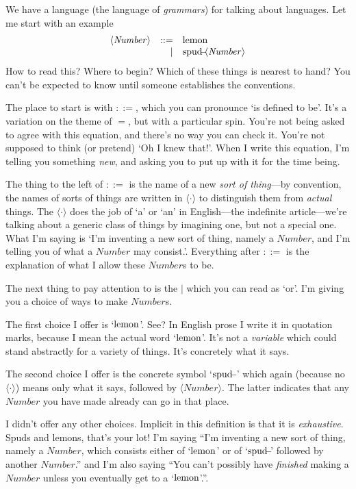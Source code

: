 \documentclass{book}
\begin{document}
We have a language (the language of \emph{grammars}) for talking about languages. Let me start with an example
\newcommand{\nt}[1]{\langle\mathit{#1}\rangle}
\[\begin{array}{rrl}
\nt{Number} & ::= & \lemon\\
            &   | & \spud\nt{Number}
\end{array}\]
How to read this? Where to begin? Which of these things is nearest to hand? You can't be expected to know until someone establishes the conventions.

The place to start is with $::=$, which you can pronounce `is defined to be'. It's a variation on the theme of $=$, but with a particular spin. You're not being asked to agree with this equation, and there's no way you can check it. You're not supposed to think (or pretend) `Oh I knew that!'. When I write this equation, I'm telling you something \emph{new}, and asking you to put up with it for the time being.

The thing to the left of $::=$ is the name of a new \emph{sort of thing}---by convention, the names of sorts of things are written in $\nt{\cdot}$ to distinguish them from \emph{actual} things. The $\nt{\cdot}$ does the job of `a' or `an' in English---the indefinite article---we're talking about a generic class of things by imagining one, but not a special one. What I'm saying is `I'm inventing a new sort of thing, namely a $\mathit{Number}$, and I'm telling you of what a $\mathit{Number}$ may consist.'. Everything after $::=$ is the explanation of what I allow these $\mathit{Number}$s to be.

The next thing to pay attention to is the $|$ which you can read as `or'. I'm giving you a choice of ways to make $\mathit{Number}$s.

The first choice I offer is `$\mbox{lemon}$'. See? In English prose I write it in quotation marks, because I mean the actual word `$\mbox{lemon}$'. It's not a \emph{variable} which could stand abstractly for a variety of things. It's concretely what it says.

The second choice I offer is the concrete symbol `$\mbox{spud}\!\!\!-\!\!\!{\,}$' which again (because no $\nt{\cdot}$) means only what it says, followed by $\nt{Number}$. The latter indicates that any $\mathit{Number}$ you have made already can go in that place.

I didn't offer any other choices. Implicit in this definition is that it is \emph{exhaustive}. Spuds and lemons, that's your lot! I'm saying ``I'm inventing a new sort of thing, namely a $\mathit{Number}$, which consists either of `$\mbox{lemon}$' or of `$\mbox{spud}\!\!\!-\!\!\!{}$' followed by another $\mathit{Number}$.'' and I'm also saying ``You can't possibly have \emph{finished} making a $\mathit{Number}$ unless you eventually get to a `$\mbox{lemon}$'.''.
\end{document}
